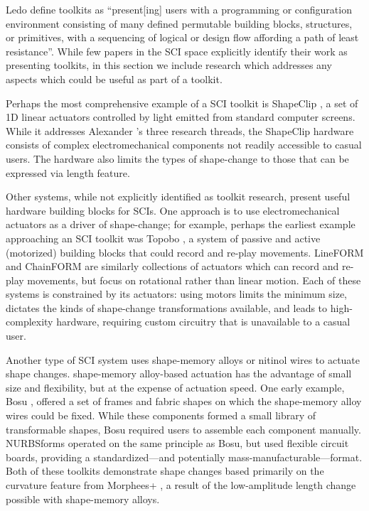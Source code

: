       Ledo \etal \cite{Ledo:2018a} define toolkits as ``present[ing] users with
      a programming or configuration environment consisting of many defined
      permutable building blocks, structures, or primitives, with a sequencing
      of logical or design flow affording a path of least resistance''. While
      few papers in the SCI space explicitly identify their work as presenting
      toolkits, in this section we include research which addresses any aspects
      which could be useful as part of a toolkit.
      
      Perhaps the most comprehensive example of a SCI toolkit is ShapeClip
      \cite{Hardy:2015dx}, a set of 1D linear actuators controlled by light
      emitted from standard computer screens. While it addresses Alexander
      \etal's three research threads, the ShapeClip hardware consists of complex
      electromechanical components not readily accessible to casual users. The
      hardware also limits the types of shape-change to those that can be
      expressed via length feature.
      
      Other systems, while not explicitly identified as toolkit research,
      present useful hardware building blocks for SCIs. One approach is to use
      electromechanical actuators as a driver of shape-change; for example,
      perhaps the earliest example approaching an SCI toolkit was Topobo
      \cite{Raffle:2004jj}, a system of passive and active (motorized) building
      blocks that could record and re-play movements. LineFORM
      \cite{Nakagaki:2015} and ChainFORM \cite{Nakagaki:2016} are similarly
      collections of actuators which can record and re-play movements, but focus
      on rotational rather than linear motion. Each of these systems is
      constrained by its actuators: using motors limits the minimum size,
      dictates the kinds of shape-change transformations available, and leads to
      high-complexity hardware, requiring custom circuitry that is unavailable
      to a casual user.
      
      Another type of SCI system uses shape-memory alloys or nitinol wires to
      actuate shape changes. shape-memory alloy-based actuation has the
      advantage of small size and flexibility, but at the expense of actuation
      speed. One early example, Bosu \cite{Parkes:2010}, offered a set of frames
      and fabric shapes on which the shape-memory alloy wires could be fixed.
      While these components formed a small library of transformable shapes,
      Bosu required users to assemble each component manually.  NURBSforms
      \cite{Tahouni:2020} operated on the same principle as Bosu, but used
      flexible circuit boards, providing a standardized---and potentially
      mass-manufacturable---format. Both of these toolkits demonstrate shape
      changes based primarily on the curvature feature from Morphees+
      \cite{10.1145/3173574.3174193}, a result of the low-amplitude length
      change possible with shape-memory alloys.
      
